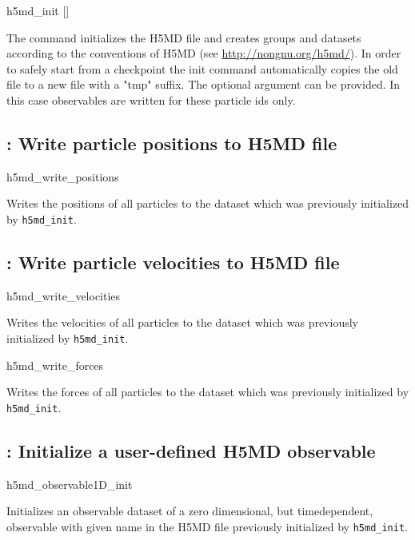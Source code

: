 \begin{essyntax}
h5md_init  []
\end{essyntax}
The  command initializes the H5MD file and
creates groups and datasets according to the conventions of H5MD (see
\url{http://nongnu.org/h5md/}). In order to safely start from a
checkpoint the init command automatically copies the old file to a new file
with a "tmp" suffix. The optional argument  can be provided. In
this case observables are written for these particle ids only.

\subsection{: Write particle positions to H5MD
file}

\begin{essyntax}
h5md_write_positions
\end{essyntax}
Writes the positions of all particles to the dataset which was previously 
initialized by \texttt{h5md_init}.

\subsection{: Write particle velocities to H5MD
file}

\begin{essyntax}
h5md_write_velocities
\end{essyntax}
Writes the velocities of all particles to the dataset which was previously 
initialized by \texttt{h5md_init}.

\begin{essyntax}
h5md_write_forces
\end{essyntax}
Writes the forces of all particles to the dataset which was previously 
initialized by \texttt{h5md_init}.

\subsection{: Initialize a user-defined H5MD
observable}

\begin{essyntax}
h5md_observable1D_init 
\end{essyntax}
Initializes an observable dataset of a zero dimensional, but timedependent, 
observable with given name in the H5MD file previously
initialized by \texttt{h5md_init}.

